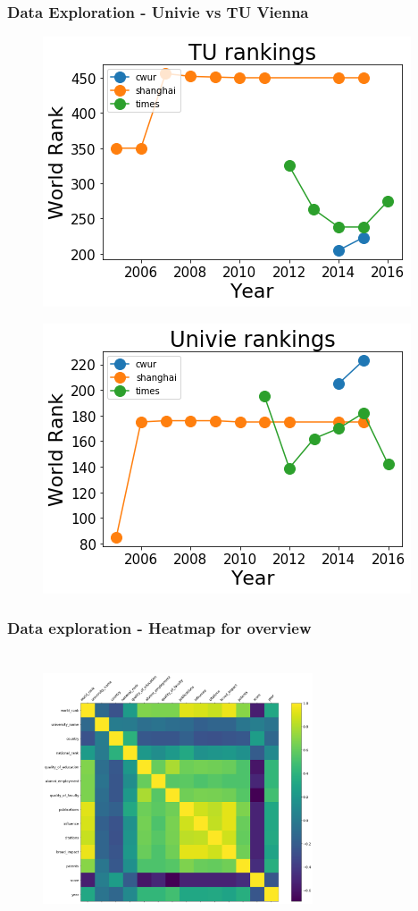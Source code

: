 \documentclass[mathserif,notheorems,11pt]{beamer}
\begin{document}
\begin{frame}
\frametitle{Data Exploration - Univie vs TU Vienna}
\begin{figure}
	\centering
	\includegraphics[width=0.45\linewidth]{graphs/tu_univie_rank_graph}
	
\end{figure}
\begin{figure}
	\centering
	\includegraphics[width=0.45\linewidth]{graphs/tu_rank_graph}
	
\end{figure}



\end{frame}

\begin{frame}
\frametitle{Data exploration - Heatmap for overview}
\begin{figure}[h]
	\centering
	\includegraphics[width=8cm,height=8cm,keepaspectratio]{graphs/world_uni_hm}

\end{figure}

\end{frame}
\end{document}

